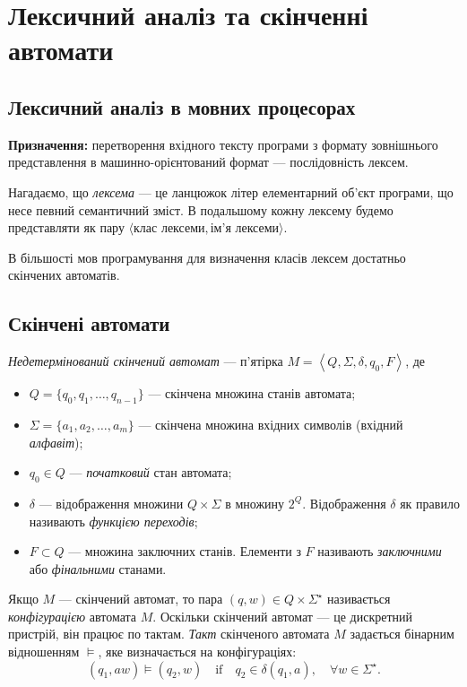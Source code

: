 \setcounter{section}{1}

\section{Лексичний аналіз та скінченні автомати}

\subsection{Лексичний аналіз в мовних процесорах}

\textbf{Призначення:} перетворення вхідного тексту програми з формату зовнішнього представлення в машинно-орієнтований формат --- послідовність лексем. \medskip

Нагадаємо, що \textit{лексема} --- це ланцюжок літер елементарний об'єкт програми, що несе певний семантичний зміст. В подальшому кожну лексему будемо представляти як пару $\langle\text{клас лексеми}, \text{ім'я лексеми}\rangle$. \medskip

В більшості мов програмування для визначення класів лексем достатньо скінчених автоматів.

\subsection{Скінчені автомати}

\textit{Недетермінований скінчений автомат} --- п'ятірка $M = \left\langle Q, \Sigma, \delta, q_0, F \right\rangle$, де
\begin{itemize}
	\item $Q = \{q_0, q_1, \ldots, q_{n-1}\}$ --- скінчена множина станів автомата;
	\item $\Sigma = \{a_1, a_2, \ldots, a_m\}$ --- скінчена множина вхідних символів (вхідний \textit{алфавіт});
	\item $q_0 \in Q$ --- \textit{початковий} стан автомата;
	\item $\delta$ --- відображення множини $Q \times \Sigma$ в множину $2^Q$. Відображення $\delta$ як правило називають \textit{функцією переходів};
	\item $F \subset Q$ --- множина заключних станів. Елементи з $F$ називають \textit{заключними} або \textit{фінальними} станами.
\end{itemize}

Якщо $M$ --- скінчений автомат, то пара $(q, w) \in Q \times \Sigma^\star$ називається \textit{конфігурацією} автомата $M$. Оскільки скінчений автомат --- це дискретний пристрій, він працює по тактам. \textit{Такт} скінченого автомата $M$ задається бінарним відношенням $\models$, яке визначається на конфігураціях:
\begin{equation}
	(q_1, a w) \models (q_2, w) \quad \text{if} \quad q_2 \in \delta(q_1, a), \quad \forall w \in \Sigma^\star.
\end{equation}

